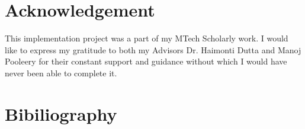 \documentclass[amsart, 12pt]{article}
\begin{document}
\section{Acknowledgement}
This implementation project was a part of my MTech Scholarly work. I would like to express my gratitude to both my Advisors Dr. Haimonti Dutta and Manoj Pooleery for their constant support and guidance without which I would have never been able to complete it.

\nocite{cdnc,eval,noisy,vaadin}

\section{Bibiliography}


\end{document}
